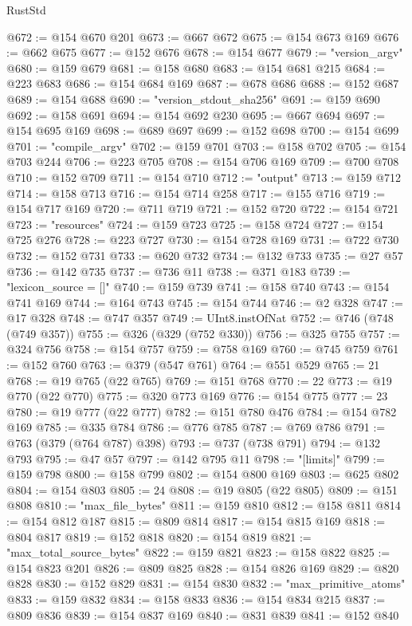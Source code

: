\begin{lexlean}{RustStd}
\begin{coremodule}
@672 := @154 @670 @201
@673 := @667 @672
@675 := @154 @673 @169
@676 := @662 @675
@677 := @152 @676
@678 := @154 @677
@679 := "version_argv"
@680 := @159 @679
@681 := @158 @680
@683 := @154 @681 @215
@684 := @223 @683
@686 := @154 @684 @169
@687 := @678 @686
@688 := @152 @687
@689 := @154 @688
@690 := "version_stdout_sha256"
@691 := @159 @690
@692 := @158 @691
@694 := @154 @692 @230
@695 := @667 @694
@697 := @154 @695 @169
@698 := @689 @697
@699 := @152 @698
@700 := @154 @699
@701 := "compile_argv"
@702 := @159 @701
@703 := @158 @702
@705 := @154 @703 @244
@706 := @223 @705
@708 := @154 @706 @169
@709 := @700 @708
@710 := @152 @709
@711 := @154 @710
@712 := "output"
@713 := @159 @712
@714 := @158 @713
@716 := @154 @714 @258
@717 := @155 @716
@719 := @154 @717 @169
@720 := @711 @719
@721 := @152 @720
@722 := @154 @721
@723 := "resources"
@724 := @159 @723
@725 := @158 @724
@727 := @154 @725 @276
@728 := @223 @727
@730 := @154 @728 @169
@731 := @722 @730
@732 := @152 @731
@733 := @620 @732
@734 := @132 @733
@735 := @27 @57
@736 := @142 @735
@737 := @736 @11
@738 := @371 @183
@739 := "lexicon_source = []"
@740 := @159 @739
@741 := @158 @740
@743 := @154 @741 @169
@744 := @164 @743
@745 := @154 @744
@746 := @2 @328
@747 := @17 @328
@748 := @747 @357
@749 := UInt8.instOfNat
@752 := @746 (@748 (@749 @357))
@755 := @326 (@329 (@752 @330))
@756 := @325 @755
@757 := @324 @756
@758 := @154 @757
@759 := @758 @169
@760 := @745 @759
@761 := @152 @760
@763 := @379 (@547 @761)
@764 := @551 @529
@765 := 21
@768 := @19 @765 (@22 @765)
@769 := @151 @768
@770 := 22
@773 := @19 @770 (@22 @770)
@775 := @320 @773 @169
@776 := @154 @775
@777 := 23
@780 := @19 @777 (@22 @777)
@782 := @151 @780 @476
@784 := @154 @782 @169
@785 := @335 @784
@786 := @776 @785
@787 := @769 @786
@791 := @763 (@379 (@764 @787) @398)
@793 := @737 (@738 @791)
@794 := @132 @793
@795 := @47 @57
@797 := @142 @795 @11
@798 := "[limits]"
@799 := @159 @798
@800 := @158 @799
@802 := @154 @800 @169
@803 := @625 @802
@804 := @154 @803
@805 := 24
@808 := @19 @805 (@22 @805)
@809 := @151 @808
@810 := "max_file_bytes"
@811 := @159 @810
@812 := @158 @811
@814 := @154 @812 @187
@815 := @809 @814
@817 := @154 @815 @169
@818 := @804 @817
@819 := @152 @818
@820 := @154 @819
@821 := "max_total_source_bytes"
@822 := @159 @821
@823 := @158 @822
@825 := @154 @823 @201
@826 := @809 @825
@828 := @154 @826 @169
@829 := @820 @828
@830 := @152 @829
@831 := @154 @830
@832 := "max_primitive_atoms"
@833 := @159 @832
@834 := @158 @833
@836 := @154 @834 @215
@837 := @809 @836
@839 := @154 @837 @169
@840 := @831 @839
@841 := @152 @840

\end{coremodule}
\end{lexlean}
